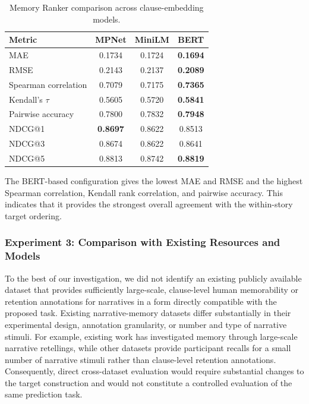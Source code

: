\documentclass[conference]{IEEEtran}
\renewcommand{\arraystretch}{0.9}
\begin{document}
\begin{table}[H]
\centering
\caption{Memory Ranker comparison across clause-embedding models.}
\label{tab:embedding_comparison}
\footnotesize
\renewcommand{\arraystretch}{1.05}
\begin{tabular}{lccc}
\hline
\textbf{Metric} & \textbf{MPNet} & \textbf{MiniLM} & \textbf{BERT} \\
\hline
MAE & 0.1734 & 0.1724 & \textbf{0.1694} \\
RMSE & 0.2143 & 0.2137 & \textbf{0.2089} \\
Spearman correlation & 0.7079 & 0.7175 & \textbf{0.7365} \\
Kendall's $\tau$ & 0.5605 & 0.5720 & \textbf{0.5841} \\
Pairwise accuracy & 0.7800 & 0.7832 & \textbf{0.7948} \\
NDCG@1 & \textbf{0.8697} & 0.8622 & 0.8513 \\
NDCG@3 & 0.8674 & 0.8622 & 0.8641 \\
NDCG@5 & 0.8813 & 0.8742 & \textbf{0.8819} \\
\hline
\end{tabular}
\end{table}

The BERT-based configuration gives the lowest MAE and RMSE and the highest Spearman correlation, Kendall rank correlation, and pairwise accuracy. This indicates that it provides the strongest overall agreement with the within-story target ordering.

\subsubsection{Experiment 3: Comparison with Existing Resources and Models}

To the best of our investigation, we did not identify an existing publicly available dataset that provides sufficiently large-scale, clause-level human memorability or retention annotations for narratives in a form directly compatible with the proposed task. Existing narrative-memory datasets differ substantially in their experimental design, annotation granularity, or number and type of narrative stimuli. For example, existing work has investigated memory through large-scale narrative retellings, while other datasets provide participant recalls for a small number of narrative stimuli rather than clause-level retention annotations. Consequently, direct cross-dataset evaluation would require substantial changes to the target construction and would not constitute a controlled evaluation of the same prediction task.
\end{document}
